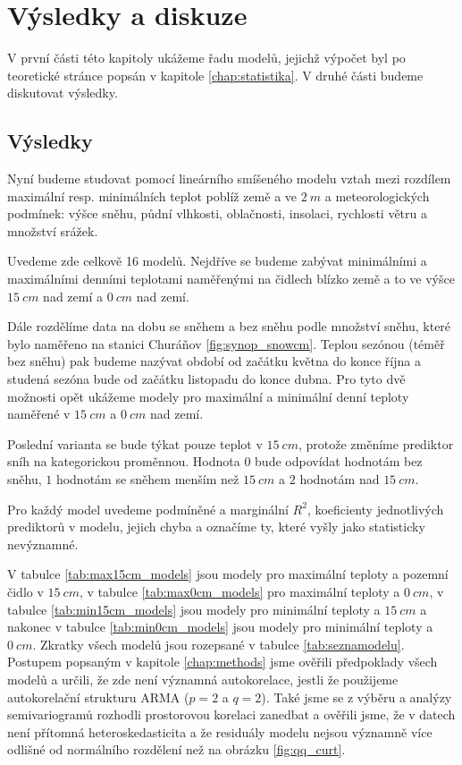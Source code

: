 \chapter{Výsledky a diskuze}\label{chap:ch3}
V první části této kapitoly ukážeme řadu modelů, jejichž výpočet byl po teoretické stránce popsán v kapitole \ref{chap:statistika}. V druhé části budeme diskutovat výsledky.

\section{Výsledky}
Nyní budeme studovat pomocí lineárního smíšeného modelu vztah mezi rozdílem maximální resp. minimálních teplot poblíž země a ve $\SI{2}{m}$ a meteorologických podmínek: výšce sněhu, půdní vlhkosti, oblačnosti, insolaci, rychlosti větru a množství srážek.

Uvedeme zde celkově 16 modelů. Nejdříve se budeme zabývat minimálními a maximálními denními teplotami naměřenými na čidlech blízko země a to ve výšce $\SI{15}{cm}$ nad zemí a $\SI{0}{cm}$ nad zemí. 

Dále rozdělíme data na dobu se sněhem a bez sněhu podle množství sněhu, které bylo naměřeno na stanici Churáňov \ref{fig:synop_snowcm}. Teplou sezónou (téměř bez sněhu) pak budeme nazývat období od začátku května do konce října a studená sezóna bude od začátku listopadu do konce dubna. Pro tyto dvě možnosti opět ukážeme modely pro maximální a minimální denní teploty naměřené v $\SI{15}{cm}$ a $\SI{0}{cm}$ nad zemí.

Poslední varianta se bude týkat pouze teplot v $\SI{15}{cm}$, protože změníme prediktor sníh na kategorickou proměnnou. Hodnota $0$ bude odpovídat hodnotám bez sněhu, $1$ hodnotám se sněhem menším než $\SI{15}{cm}$ a $2$ hodnotám nad $\SI{15}{cm}$.

Pro každý model uvedeme podmíněné a marginální $R^2$, koeficienty jednotlivých prediktorů v modelu, jejich chyba a označíme ty, které vyšly jako statisticky nevýznamné.

V tabulce \ref{tab:max15cm_models} jsou modely pro maximální teploty a pozemní čidlo v $\SI{15}{cm}$, v tabulce \ref{tab:max0cm_models} pro maximální teploty a $\SI{0}{cm}$, v tabulce \ref{tab:min15cm_models} jsou modely pro minimální teploty a $\SI{15}{cm}$ a nakonec v tabulce \ref{tab:min0cm_models} jsou modely pro minimální teploty a $\SI{0}{cm}$. Zkratky všech modelů jsou rozepsané v tabulce \ref{tab:seznamodelu}. Postupem popsaným v kapitole \ref{chap:methods} jsme ověřili předpoklady všech modelů a určili, že zde není významná autokorelace, jestli že použijeme autokorelační strukturu ARMA ($p=2$ a $q=2$). Také jsme se z výběru a analýzy semivariogramů rozhodli prostorovou korelaci zanedbat a ověřili jsme, že v datech není přítomná heteroskedasticita a že residuály modelu nejsou významně více odlišné od normálního rozdělení než na obrázku \ref{fig:qq_curt}.

